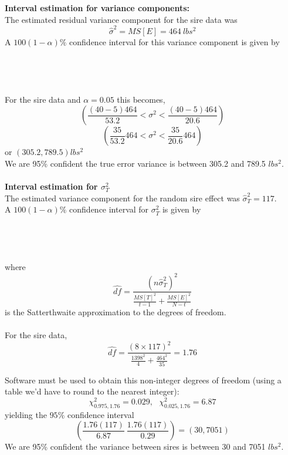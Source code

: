 \textbf{Interval estimation for variance components:}\\
The estimated residual variance component for the sire data was
$$\hat\sigma^2 = MS[E] = 464~lbs^2$$ 
A $100(1-\alpha)\%$ confidence interval for this variance component is given by \\~\\~\\~\\~\\
For the sire data and $\alpha=0.05$ this becomes,
$$\left(\frac{(40-5)464}{53.2} < \sigma^2 < \frac{(40-5)464}{20.6}\right) $$
$$\left(\frac{35}{53.2}464 < \sigma^2 < \frac{35}{20.6}464\right)$$
or $(305.2,789.5) lbs^2$\\
We are 95\% confident the true error variance is between 305.2 and 789.5 $lbs^2$.\\~\\

\textbf{Interval estimation for $\sigma_T^2$}\\
The estimated variance component for the random sire effect was $\hat\sigma_T^2 = 117$.\\
A $100(1-\alpha)\%$ confidence interval for $\sigma^2_T$ is given by \\~\\~\\~\\~\\
where 
$$\widehat{df} = \frac{(n \hat\sigma_T^2)^2}{\frac{MS[T]^2}{t-1} + \frac{MS[E]^2}{N-t}}$$
is the Satterthwaite approximation to the degrees of freedom.\\~\\
For the sire data,
$$ \widehat{df} = \frac{(8 \times 117)^2}{\frac{1398^2}{4}+\frac{464^2}{35}} = 1.76$$

Software must be used to obtain this non-integer degrees of freedom (using a table we'd have to round to the nearest integer):
$$ \chi^2_{0.975,1.76} = 0.029, \ \ \ \chi^2_{0.025,1.76} = 6.87 $$
yielding the $95\%$ confidence interval
$$ \left(\frac{1.76 (117)}{6.87} \ \frac{1.76 (117)}{0.29} \right)=(30,7051)$$
We are 95\% confident the variance between sires is between 30 and 7051 $lbs^2$.

